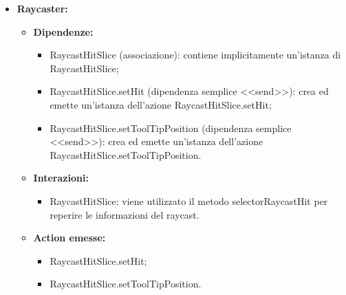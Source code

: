 \begin{itemize}
    \item \textbf{Raycaster:}
    \begin{itemize}
        \item \textbf{Dipendenze:}
        \begin{itemize}
            \item RaycastHitSlice (associazione): contiene implicitamente un'istanza di RaycastHitSlice;
            \item RaycastHitSlice.setHit (dipendenza semplice <<send>>):  crea ed emette un’istanza dell’azione RaycastHitSlice.setHit;
            \item RaycastHitSlice.setToolTipPosition (dipendenza semplice <<send>>):  crea ed emette un’istanza dell’azione RaycastHitSlice.setToolTipPosition.
        \end{itemize} 
        \item \textbf{Interazioni:}
        \begin{itemize}
            \item RaycastHitSlice: viene utilizzato il metodo selectorRaycastHit per reperire le informazioni del raycast.
        \end{itemize}
        \item \textbf{Action emesse:}
        \begin{itemize}
            \item RaycastHitSlice.setHit;
            \item RaycastHitSlice.setToolTipPosition.
        \end{itemize}   
    \end{itemize}
\end{itemize}

